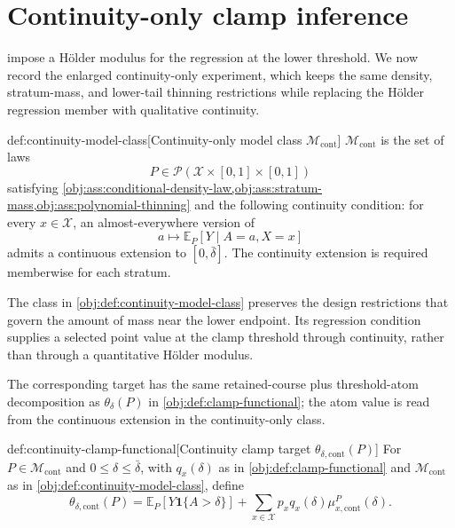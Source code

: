 \section{Continuity-only clamp inference}
\label{sec:continuity-only}

 impose a Hölder modulus for the regression at the lower threshold. We now record the enlarged continuity-only experiment, which keeps the same density, stratum-mass, and lower-tail thinning restrictions while replacing the Hölder regression member with qualitative continuity.

\begin{definitionv}{def:continuity-model-class}[Continuity-only model class \(\mathcal M_{\mathrm{cont}}\)]
\(\mathcal M_{\mathrm{cont}}\) is the set of laws
\[
P\in\mathcal P(\mathcal X\times[0,1]\times[0,1])
\]
satisfying \cref{obj:ass:conditional-density-law,obj:ass:stratum-mass,obj:ass:polynomial-thinning} and the following continuity condition: for every \(x\in\mathcal X\), an almost-everywhere version of
\[
a\mapsto \mathbb E_P[Y\mid A=a,X=x]
\]
admits a continuous extension to \([0,\bar\delta]\). The continuity extension is required memberwise for each stratum.
\end{definitionv}

The class in \cref{obj:def:continuity-model-class} preserves the design restrictions that govern the amount of mass near the lower endpoint. Its regression condition supplies a selected point value at the clamp threshold through continuity, rather than through a quantitative Hölder modulus.

The corresponding target has the same retained-course plus threshold-atom decomposition as \(\theta_\delta(P)\) in \cref{obj:def:clamp-functional}; the atom value is read from the continuous extension in the continuity-only class.

\begin{definitionv}{def:continuity-clamp-functional}[Continuity clamp target \(\theta_{\delta,\mathrm{cont}}(P)\)]
For \(P\in\mathcal M_{\mathrm{cont}}\) and \(0\leq\delta\leq\bar\delta\), with \(q_x(\delta)\) as in \cref{obj:def:clamp-functional} and \(\mathcal M_{\mathrm{cont}}\) as in \cref{obj:def:continuity-model-class}, define
\[
 \theta_{\delta,\mathrm{cont}}(P)
 =
 \mathbb E_P\!\left[Y\mathbf 1\{A>\delta\}\right]
 +
 \sum_{x\in\mathcal X}
 p_xq_x(\delta)\mu_{x,\mathrm{cont}}^P(\delta).
\]
\end{definitionv}

